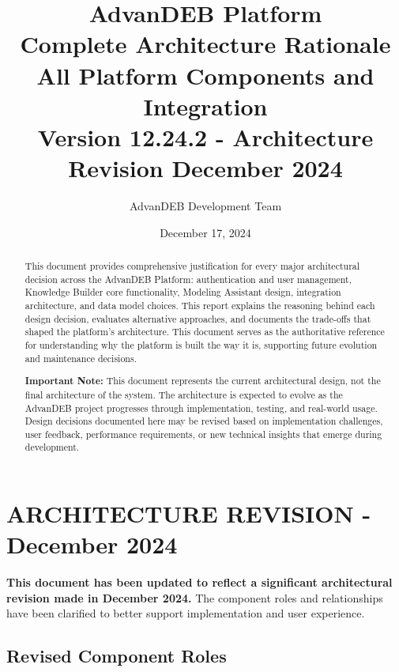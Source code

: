 \documentclass[12pt,a4paper]{article}
\title{
    \textbf{\Huge \textcolor{titlecolor}{AdvanDEB Platform}}\\
    \vspace{0.5cm}
    \Large Complete Architecture Rationale\\
    \large All Platform Components and Integration\\
    \vspace{0.3cm}
    \normalsize Version 12.24.2 - Architecture Revision December 2024
}
\author{AdvanDEB Development Team}
\date{December 17, 2024}
\begin{document}
\maketitle
\thispagestyle{empty}

\vspace{2cm}

\begin{abstract}
This document provides comprehensive justification for every major architectural decision across the AdvanDEB Platform: authentication and user management, Knowledge Builder core functionality, Modeling Assistant design, integration architecture, and data model choices. This report explains the reasoning behind each design decision, evaluates alternative approaches, and documents the trade-offs that shaped the platform's architecture. This document serves as the authoritative reference for understanding why the platform is built the way it is, supporting future evolution and maintenance decisions.

\textbf{Important Note:} This document represents the current architectural design, not the final architecture of the system. The architecture is expected to evolve as the AdvanDEB project progresses through implementation, testing, and real-world usage. Design decisions documented here may be revised based on implementation challenges, user feedback, performance requirements, or new technical insights that emerge during development.
\end{abstract}

\newpage
\tableofcontents
\newpage

\section{ARCHITECTURE REVISION - December 2024}

\begin{tcolorbox}[colback=red!5!white,colframe=red!75!black,title=\textbf{Important: Architecture Model Updated}]
\textbf{This document has been updated to reflect a significant architectural revision made in December 2024.} The component roles and relationships have been clarified to better support implementation and user experience.
\end{tcolorbox}

\subsection{Revised Component Roles}
\end{document}
